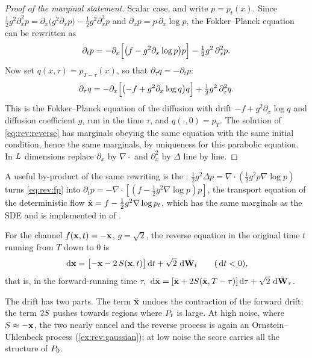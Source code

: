 \begin{proof}[Proof of the marginal statement]
Scalar case, and write $p=p_t(x)$. Since $\tfrac12g^2\partial_x^2p=\partial_x\bigl(g^2\partial_xp\bigr)-\tfrac12g^2\partial_x^2p$
and $\partial_xp=p\,\partial_x\log p$, the Fokker--Planck equation can be rewritten as
\[
  \partial_tp=-\partial_x\Bigl[\bigl(f-g^2\partial_x\log p\bigr)p\Bigr]-\tfrac12g^2\,\partial_x^2p .
\]
Now set $q(x,\tau)=p_{T-\tau}(x)$, so that $\partial_\tau q=-\partial_tp$:
\[
  \partial_\tau q=-\partial_x\Bigl[\bigl(-f+g^2\partial_x\log q\bigr)q\Bigr]+\tfrac12g^2\,\partial_x^2q .
\]
This is the Fokker--Planck equation of the diffusion with drift $-f+g^2\partial_x\log q$
and diffusion coefficient $g$, run in the time $\tau$, and $q(\cdot,0)=p_T$. The
solution of \cref{eq:rev:reverse} has marginals obeying the same equation with the
same initial condition, hence the same marginals, by uniqueness for this parabolic
equation. In $L$ dimensions replace $\partial_x$ by $\nabla\cdot$ and
$\partial_x^2$ by $\Delta$ line by line.
\end{proof}

A useful by-product of the same rewriting is the :
$\tfrac12g^2\Delta p=\nabla\cdot(\tfrac12g^2p\nabla\log p)$ turns \cref{eq:rev:fp} into
$\partial_tp=-\nabla\cdot[(f-\tfrac12g^2\nabla\log p)p]$, the transport equation of the
deterministic flow $\dot{\mathbf{x}}=f-\tfrac12g^2\nabla\log p_t$, which has the same
marginals as the SDE and is implemented in  of
.

\begin{corollary}
\label{cor:rev:ou}
For the channel $f(\mathbf{x},t)=-\mathbf{x}$, $g=\sqrt2$, the reverse equation in the original time
$t$ running from $T$ down to $0$ is
\begin{equation}
  \,\mathrm{d}\mathbf{x}=\bigl[-\mathbf{x}-2\,S(\mathbf{x},t)\bigr]\,\mathrm{d} t+\sqrt2\,\,\mathrm{d}\bar{\mathbf{W}}_t\qquad(\,\mathrm{d} t<0),
  \label{eq:rev:ou}
\end{equation}
that is, in the forward-running time $\tau$, $\,\mathrm{d}\bar{\mathbf{x}}=[\bar{\mathbf{x}}+2S(\bar{\mathbf{x}},T-\tau)]\,\mathrm{d}\tau+\sqrt2\,\,\mathrm{d}\bar{\mathbf{W}}_\tau$.
\end{corollary}

The drift has two parts. The term $\bar{\mathbf{x}}$ undoes the contraction of the forward
drift; the term $2S$ pushes towards regions where $P_t$ is large. At high noise,
where $S\approx-\mathbf{x}$, the two nearly cancel and the reverse process is again an
Ornstein--Uhlenbeck process (\cref{ex:rev:gaussian}); at low noise the score carries
all the structure of $P_0$.

